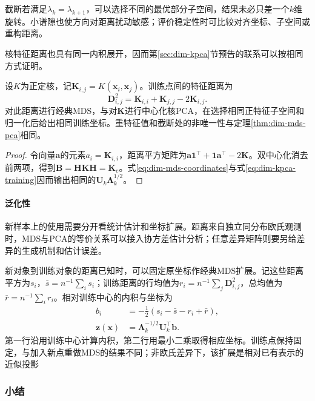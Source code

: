 截断若满足$\lambda_k=\lambda_{k+1}$，可以选择不同的最优部分子空间，结果未必只差一个$k$维旋转。小谱隙也使方向对距离扰动敏感；评价稳定性时可比较对齐坐标、子空间或重构距离。

核特征距离也具有同一内积展开，因而第\ref{sec:dim-kpca}节预告的联系可以按相同方式证明。

\begin{theorem}[核诱导距离下的等价关系]
  \label{thm:dim-kpca-mds}
  设$K$为正定核，记$\bm{K}_{i,j}=K(\bm{x}_i,\bm{x}_j)$。训练点间的特征距离为
  \[
    \bm{D}_{i,j}^2
    =\bm{K}_{i,i}+\bm{K}_{j,j}-2\bm{K}_{i,j}.
  \]
  对此距离进行经典MDS，与对$\bm{K}$进行中心化核PCA，在选择相同正特征子空间和归一化后给出相同训练坐标。重特征值和截断处的非唯一性与定理\ref{thm:dim-mds-pca}相同。
\end{theorem}
\begin{proof}
  令向量$\bm{a}$的元素$a_i=\bm{K}_{i,i}$，距离平方矩阵为$\bm{a}\bm{1}^{\top}+\bm{1}\bm{a}^{\top}-2\bm{K}$。双中心化消去前两项，得到$\bm{B}=\bm{H}\bm{K}\bm{H}=\bm{K}_{\mathrm{c}}$。式\eqref{eq:dim-mds-coordinates}与式\eqref{eq:dim-kpca-training}因而输出相同的$\bm{U}_k\bm{\Lambda}_k^{1/2}$。
\end{proof}

\paragraph{泛化性}

新样本上的使用需要分开看统计估计和坐标扩展。距离来自独立同分布欧氏观测时，MDS与PCA的等价关系可以接入协方差估计分析；任意差异矩阵则要另给差异的生成机制和估计误差。

新对象到训练对象的距离已知时，可以固定原坐标作经典MDS扩展。记这些距离平方为$s_i$，$\bar s=n^{-1}\sum_i s_i$；训练距离的行均值为$r_i=n^{-1}\sum_j\bm{D}_{i,j}^2$，总均值为$\bar r=n^{-1}\sum_i r_i$。相对训练中心的内积与坐标为
\begin{equation}
  \label{eq:dim-mds-extension}
  \begin{aligned}
    b_i&=-\frac12(s_i-\bar s-r_i+\bar r),\\
    \bm{z}(\bm{x})
      &=\bm{\Lambda}_k^{-1/2}\bm{U}_k^{\top}\bm{b}.
  \end{aligned}
\end{equation}
第一行沿用训练中心计算内积，第二行用最小二乘取得相应坐标。训练点保持固定，与加入新点重做MDS的结果不同；非欧氏差异下，该扩展是相对已有表示的近似投影

\subsubsection{小结}

